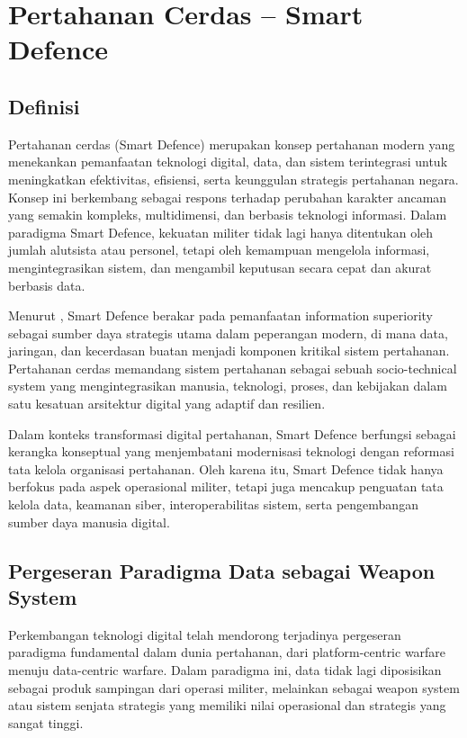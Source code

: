 \section{Pertahanan Cerdas – Smart Defence}
\subsection{Definisi}
Pertahanan cerdas (Smart Defence) merupakan konsep pertahanan modern yang menekankan pemanfaatan teknologi digital, data, dan sistem terintegrasi untuk meningkatkan efektivitas, efisiensi, serta keunggulan strategis pertahanan negara.
Konsep ini berkembang sebagai respons terhadap perubahan karakter ancaman yang semakin kompleks, multidimensi, dan berbasis teknologi informasi.
Dalam paradigma Smart Defence, kekuatan militer tidak lagi hanya ditentukan oleh jumlah alutsista atau personel, tetapi oleh kemampuan mengelola informasi, mengintegrasikan sistem, dan mengambil keputusan secara cepat dan akurat berbasis data.

Menurut \textcite{scribd_network_centric_warfare}, Smart Defence berakar pada pemanfaatan information superiority sebagai sumber daya strategis utama dalam peperangan modern, di mana data, jaringan, dan kecerdasan buatan menjadi komponen kritikal sistem pertahanan.
Pertahanan cerdas memandang sistem pertahanan sebagai sebuah socio-technical system yang mengintegrasikan manusia, teknologi, proses, dan kebijakan dalam satu kesatuan arsitektur digital yang adaptif dan resilien.

Dalam konteks transformasi digital pertahanan, Smart Defence berfungsi sebagai kerangka konseptual yang menjembatani modernisasi teknologi dengan reformasi tata kelola organisasi pertahanan.
Oleh karena itu, Smart Defence tidak hanya berfokus pada aspek operasional militer, tetapi juga mencakup penguatan tata kelola data, keamanan siber, interoperabilitas sistem, serta pengembangan sumber daya manusia digital.

\subsection{Pergeseran Paradigma Data sebagai Weapon System}
Perkembangan teknologi digital telah mendorong terjadinya pergeseran paradigma fundamental dalam dunia pertahanan, dari platform-centric warfare menuju data-centric warfare.
Dalam paradigma ini, data tidak lagi diposisikan sebagai produk sampingan dari operasi militer, melainkan sebagai weapon system atau sistem senjata strategis yang memiliki nilai operasional dan strategis yang sangat tinggi.

